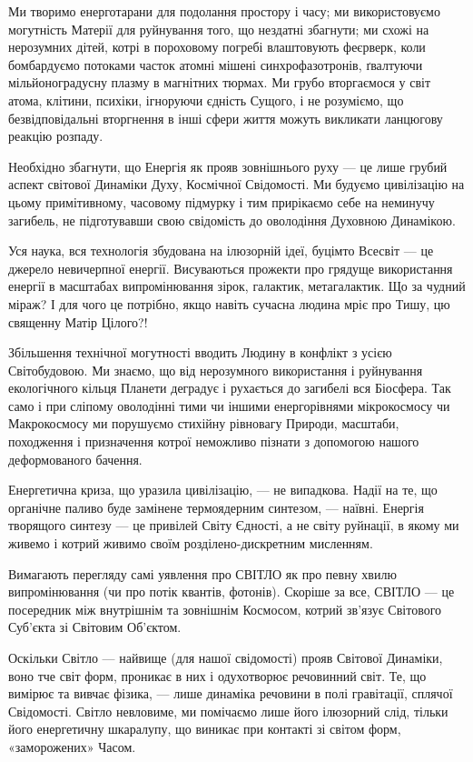 Ми творимо енерготарани для подолання простору і часу; ми використовуємо
могутність Матерії для руйнування того, що нездатні збагнути; ми схожі на
нерозумних дітей, котрі в пороховому погребі влаштовують феєрверк, коли
бомбардуємо потоками часток атомні мішені синхрофазотронів, ґвалтуючи
мільйоноградусну плазму в магнітних тюрмах. Ми грубо вторгаємося у світ атома,
клітини, психіки, ігноруючи єдність Сущого, і не розуміємо, що безвідповідальні
вторгнення в інші сфери життя можуть викликати ланцюгову реакцію розпаду.

Необхідно збагнути, що Енергія як прояв зовнішнього руху — це лише грубий
аспект світової Динаміки Духу, Космічної Свідомості. Ми будуємо цивілізацію на
цьому примітивному, часовому підмурку і тим прирікаємо себе на неминучу
загибель, не підготувавши свою свідомість до оволодіння Духовною Динамікою.

Уся наука, вся технологія збудована на ілюзорній ідеї, буцімто Всесвіт — це
джерело невичерпної енергії. Висуваються прожекти про грядуще використання
енергії в масштабах випромінювання зірок, галактик, метагалактик. Що за чудний
міраж? І для чого це потрібно, якщо навіть сучасна людина мріє про Тишу, цю
священну Матір Цілого?!

Збільшення технічної могутності вводить Людину в конфлікт з усією Світобудовою.
Ми знаємо, що від нерозумного використання і руйнування екологічного кільця
Планети деградує і рухається до загибелі вся Біосфера. Так само і при сліпому
оволодінні тими чи іншими енергорівнями мікрокосмосу чи Макрокосмосу ми
порушуємо стихійну рівновагу Природи, масштаби, походження і призначення котрої
неможливо пізнати з допомогою нашого деформованого бачення.

Енергетична криза, що уразила цивілізацію, — не випадкова. Надії на те, що
органічне паливо буде замінене термоядерним синтезом, — наївні. Енергія
творящого синтезу — це привілей Світу Єдності, а не світу руйнації, в якому ми
живемо і котрий живимо своїм розділено-дискретним мисленням.

Вимагають перегляду самі уявлення про СВІТЛО як про певну хвилю випромінювання
(чи про потік квантів, фотонів). Скоріше за все, СВІТЛО — це посередник між
внутрішнім та зовнішнім Космосом, котрий зв’язує Світового Суб’єкта зі Світовим
Об’єктом.

Оскільки Світло — найвище (для нашої свідомості) прояв Світової Динаміки, воно
тче світ форм, проникає в них і одухотворює речовинний світ. Те, що вимірює та
вивчає фізика, — лише динаміка речовини в полі гравітації, сплячої Свідомості.
Світло невловиме, ми помічаємо лише його ілюзорний слід, тільки його
енергетичну шкаралупу, що виникає при контакті зі світом форм, «заморожених»
Часом.

